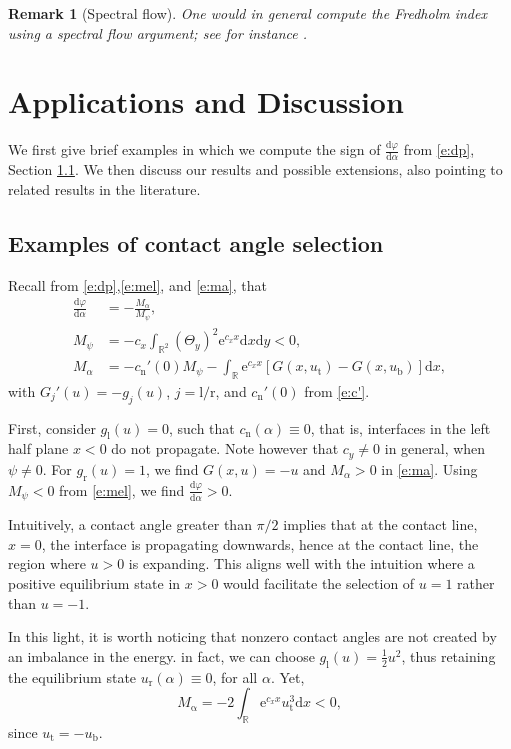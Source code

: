\documentclass[10pt]{article}
\newtheorem{Remark}[Lemma]{Remark}
\newcommand{\R}{\mathbb{R}}
\newcommand{\rmd}{\mathrm{d}}
\newcommand{\rme}{\mathrm{e}}
\begin{document}
\begin{Remark}[Spectral flow] One would in general compute the Fredholm index using a spectral flow argument; see for instance \cite{Salamon,ssmorse}.
\end{Remark}

\section{Applications and Discussion}\label{s:5}
We first give brief examples in which we compute the sign of $\frac{\rmd \varphi}{\rmd\alpha}$ from \eqref{e:dp}, Section \ref{s:5.1}. We then discuss our results and possible extensions, also pointing to related results in the literature. 

\subsection{Examples of contact angle selection}\label{s:5.1}
Recall from \eqref{e:dp},\eqref{e:mel}, and \eqref{e:ma}, that
\begin{align*}\label{e:exp}
\frac{\rmd\varphi}{\rmd\alpha}&=-\frac{M_\alpha}{M_\psi},\\
M_\psi&=-c_x\int_{\R^2}\left(\Theta_y\right)^2\rme^{c_x x}\rmd x \rmd y<0,\\
M_\alpha&=-c_\mathrm{n}'(0)M_\psi-\int_\R \rme^{c_x x} \left[G(x,u_\mathrm{t})-G(x,u_\mathrm{b})\right] \rmd x,
\end{align*}
with $G_j'(u)=-g_j(u)$, $j=\mathrm{l/r}$, and $c_\mathrm{n}'(0)$ from \eqref{e:c'}. 

First, consider $g_\mathrm{l}(u)=0$, such that $c_\mathrm{n}(\alpha)\equiv 0$, that is, interfaces in the left half plane $x<0$ do not propagate. Note however that $c_y\neq 0$ in general, when $\psi\neq 0$. For $g_\mathrm{r}(u)=1$, we find $G(x,u)=-u$ and $M_\alpha>0$ in \eqref{e:ma}. Using $M_\psi<0$ from \eqref{e:mel}, we find $\frac{\rmd \varphi}{\rmd\alpha}>0$.

Intuitively, a contact angle greater than $\pi/2$ implies that at the contact line, $x=0$, the interface is propagating downwards, hence at the contact line, the region where $u>0$ is expanding. This aligns well with the intuition where a positive equilibrium state in $x>0$ would facilitate the selection of $u=1$ rather than $u=-1$. 

In this light, it is worth noticing that nonzero contact angles are not created by an imbalance in the energy. in fact, we can choose $g_\mathrm{l}(u)=\frac{1}{2}u^2$, thus retaining the equilibrium state $u_\mathrm{r}(\alpha)\equiv 0$, for all $\alpha$. Yet, 
\[
M_\mathrm{\alpha}=-2\int_\R\rme^{c_x x}u_\mathrm{t}^3\rmd x<0,
\]
since $u_\mathrm{t}=-u_\mathrm{b}$. 
\end{document}
